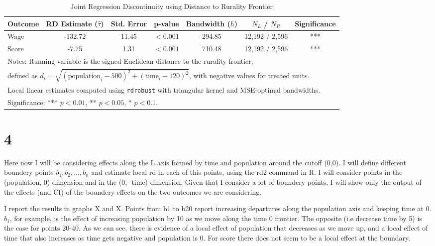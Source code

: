 \documentclass{article}
\begin{document}
\begin{table}[H]
\centering
\caption{Joint Regression Discontinuity using Distance to Rurality Frontier}
\label{tab:rd_rurality}
\begin{tabular}{lcccccc}
\hline
Outcome & RD Estimate ($\hat{\tau}$) & Std. Error & p-value & Bandwidth ($h$) & $N_L$ / $N_R$ & Significance \\
\hline
Wage  & -132.72 & 11.45 & $<0.001$ & 294.85 & 12,192 / 2,596 & *** \\
Score & -7.75   & 1.31  & $<0.001$ & 710.48 & 12,192 / 2,596 & *** \\
\hline
\multicolumn{7}{l}{\footnotesize Notes: Running variable is the signed Euclidean distance to the rurality frontier, }\\
\multicolumn{7}{l}{\footnotesize defined as $d_i = \sqrt{(\text{population}_i - 500)^2 + (\text{time}_i - 120)^2}$, with negative values for treated units.}\\
\multicolumn{7}{l}{\footnotesize Local linear estimates computed using \texttt{rdrobust} with triangular kernel and MSE-optimal bandwidths.}\\
\multicolumn{7}{l}{\footnotesize Significance: *** $p<0.01$, ** $p<0.05$, * $p<0.1$.}\\
\end{tabular}
\end{table}


\section{4}

Here now I will be considering effects along the L axis formed by time and population around the cutoff (0,0). I will define different boundery points $b_1, b_2,..., b_n$ and estimate local rd in each of this points, using the rd2 command in R. I will consider points in the (population, 0) dimension and in the (0, -time) dimension. Given that I consider a lot of boundery points, I will show only the output of the effects (and CI) of the boundery effects on the two outcomes we are considering. 

I report the results in graphs X and X. Points from b1 to b20 report increasing departures along the population axis and keeping time at 0. $b_1$, for example, is the effect of increasing population by 10 as we move along the time 0 frontier. The opposite (i.e decrease time by 5) is the case for points 20-40. As we can see, there is evidence of a local effect of population that decreases as we move up, and a local effect of time that also increases as time gets negative and population is 0. For score there does not seem to be a local effect at the boundary.
\end{document}
